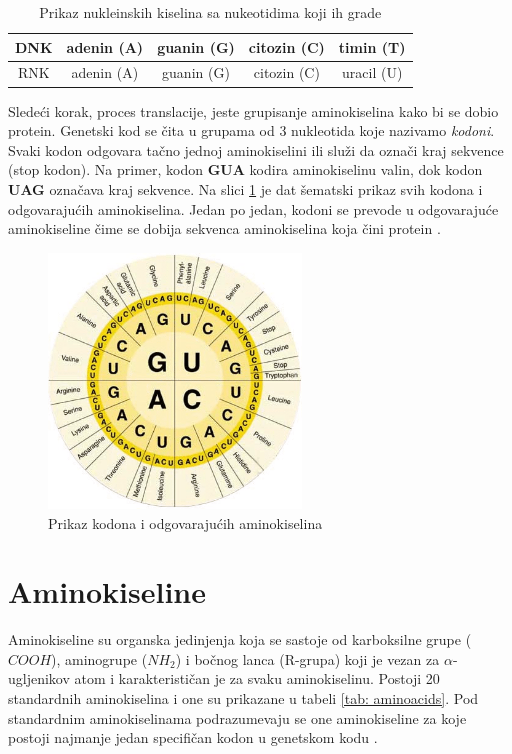 \begin{table}[H]
	\centering
	\begin{tabular}{|c|c|c|c|c|}
		\hline
		DNK & adenin (A) & guanin (G) & citozin (C) & timin (T) \\
		\hline
		RNK & adenin (A) & guanin (G) & citozin (C) & uracil (U) \\
		\hline             
	\end{tabular}
	\caption{Prikaz nukleinskih kiselina sa nukeotidima koji ih grade}
	\label{tab: nucleotides}
\end{table}


Sledeći korak, proces translacije, jeste grupisanje aminokiselina kako bi se dobio protein. Genetski kod se čita u grupama od 3 nukleotida koje nazivamo \textit{kodoni}. Svaki kodon odgovara tačno jednoj aminokiselini ili služi da označi kraj sekvence (stop kodon). Na primer, kodon \textbf{GUA} kodira aminokiselinu valin, dok kodon \textbf{UAG} označava kraj sekvence. Na slici \ref{fig:codons} je dat šematski prikaz svih kodona i odgovarajućih aminokiselina. Jedan po jedan, kodoni se prevode u odgovarajuće aminokiseline čime se dobija sekvenca aminokiselina koja čini protein \cite{BMBG, synthesisOnl}.

\begin{figure}[h]
	\centering
	\includegraphics[width=0.6\textwidth]{Figures/codons_chart.png}
	\caption{Prikaz kodona i odgovarajućih aminokiselina}
	\label{fig:codons}
\end{figure}


\section{Aminokiseline}

Aminokiseline su organska jedinjenja koja se sastoje od karboksilne grupe ($COOH$), aminogrupe ($NH_2$) i bočnog lanca (R-grupa) koji je vezan za $\alpha$-ugljenikov atom i karakterističan je za svaku aminokiselinu. Postoji 20 standardnih aminokiselina i one su prikazane u tabeli \ref{tab: aminoacids}. Pod standardnim aminokiselinama podrazumevaju se one aminokiseline za koje postoji najmanje jedan specifičan kodon u genetskom kodu \cite{biochemestry5, biohUdz, straus}.


